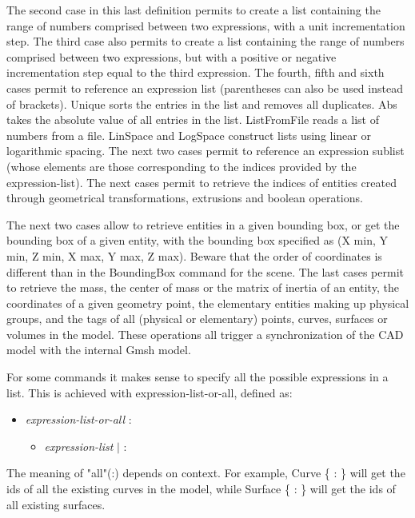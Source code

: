 \documentclass[dvipdfmx, 9pt, a4paper]{article}
\numberwithin{equation}{section}
\begin{document}
The second case in this last definition permits to create a list containing the range of numbers comprised between two expressions, with a unit incrementation step. The third case also permits to create a list containing the range of numbers comprised between two expressions, but with a positive or negative incrementation step equal to the third expression. The fourth, fifth and sixth cases permit to reference an expression list (parentheses can also be used instead of brackets). Unique sorts the entries in the list and removes all duplicates. Abs takes the absolute value of all entries in the list. ListFromFile reads a list of numbers from a file. LinSpace and LogSpace construct lists using linear or logarithmic spacing. The next two cases permit to reference an expression sublist (whose elements are those corresponding to the indices provided by the expression-list). The next cases permit to retrieve the indices of entities created through geometrical transformations, extrusions and boolean operations.\par
The next two cases allow to retrieve entities in a given bounding box, or get the bounding box of a given entity, with the bounding box specified as (X min, Y min, Z min, X max, Y max, Z max). Beware that the order of coordinates is different than in the BoundingBox command for the scene. The last cases permit to retrieve the mass, the center of mass or the matrix of inertia of an entity, the coordinates of a given geometry point, the elementary entities making up physical groups, and the tags of all (physical or elementary) points, curves, surfaces or volumes in the model. These operations all trigger a synchronization of the CAD model with the internal Gmsh model.\par
For some commands it makes sense to specify all the possible expressions in a list. This is achieved with expression-list-or-all, defined as:
\begin{itemize}
\item {\it expression-list-or-all} :
\begin{itemize}
\item {\it expression-list} $|$ :
\end{itemize}
\end{itemize}
The meaning of "all"(:) depends on context. For example, Curve \{ : \} will get the ids of all the existing curves in the model, while Surface \{ : \} will get the ids of all existing surfaces.
\end{document}

